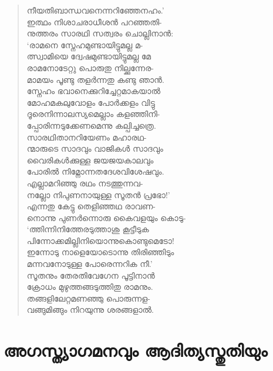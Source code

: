 \begin{verse}
നീയതിബാന്ധവനെന്നറിഞ്ഞേനഹം.’\\
ഇത്ഥം നിശാചരാധീശന്‍ പറഞ്ഞതി-\\
നുത്തരം സാരഥി സത്വരം ചൊല്ലിനാന്‍:\\
‘രാമനെ സ്നേഹമുണ്ടായിട്ടുമല്ല മ-\\
ത്സ്വാമിയെ ദ്വേഷമുണ്ടായിട്ടുമല്ല മേ\\
രാമനോടേറ്റു പൊരുതു നില്ക്കുന്നേര-\\
മാമയം പൂണ്ടു തളര്‍ന്നതു കണ്ടു ഞാന്‍.\\
സ്നേഹം ഭവാനെക്കുറിച്ചേറ്റമാകയാല്‍\\
മോഹമകലുവോളം പോര്‍ക്കളം വിട്ടു\\
ദൂരെനിന്നാലസ്യമെല്ലാം കളഞ്ഞിനി-\\
പ്പോരിന്നടുക്കേണമെന്നു കല്പിച്ചത്രെ.\\
സാരഥിതാനറിയേണം മഹാരഥ-\\
ന്മാരുടെ സാദവും വാജികള്‍ സാദവും\\
വൈരികള്‍ക്കുള്ള ജയജയകാലവും\\
പോരില്‍ നിമ്നോന്നതദേശവിശേഷവും.\\
എല്ലാമറിഞ്ഞു രഥം നടത്തുന്നവ-\\
നല്ലോ നിപുണനായുള്ള സൂതന്‍ പ്രഭോ!’\\
എന്നതു കേട്ടു തെളിഞ്ഞഥ രാവണ-\\
നൊന്നു പുണര്‍ന്നൊരു കൈവളയും കൊടു-\\
‘ത്തിന്നിനിത്തേരടുത്താശു കൂട്ടീടുക\\
പിന്നോക്കമില്ലിനിയൊന്നുകൊണ്ടുമെടോ!\\
ഇന്നോടു നാളെയോടൊന്നു തിരിഞ്ഞിടും\\
മന്നവനോടുള്ള പോരെന്നറിക നീ.’\\
സൂതനും തേരതിവേഗേന പൂട്ടിനാന്‍\\
ക്രോധം മുഴുത്തങ്ങടുത്തിതു രാമനും.\\
തങ്ങളിലേറ്റമണഞ്ഞു പൊരുന്നള-\\
വങ്ങുമിങ്ങും നിറയുന്നു ശരങ്ങളാല്‍.
\end{verse}


\section{അഗസ്ത്യാഗമനവും ആദിത്യസ്തുതിയും}

